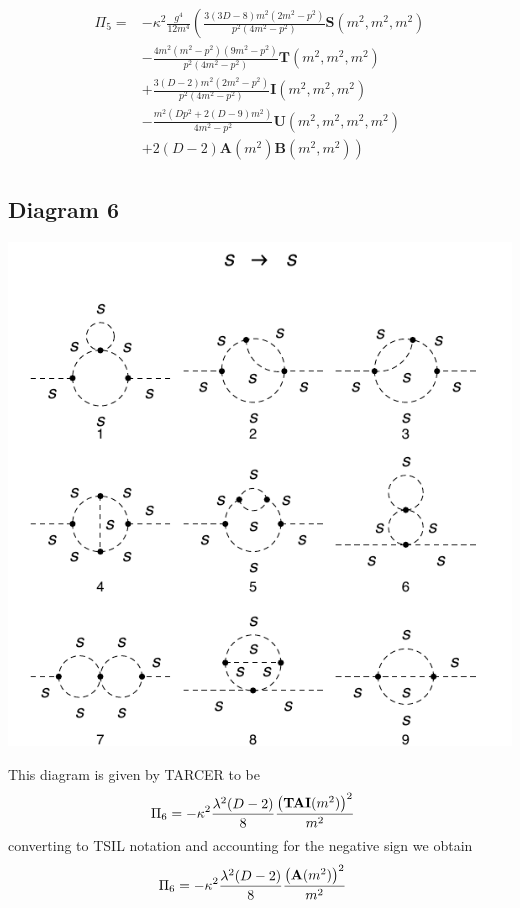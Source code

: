 \documentclass[11pt]{article}
\begin{document}
\begin{align}
\begin{split}
\Pi_5 =& - \kappa^2 \frac{g^4}{12 m^4} \left( \frac{3(3D-8)m^2(2m^2-p^2)}{p^2(4m^2-p^2)}\mathbf{S}(m^2,m^2,m^2)\right. \\
&-\frac{4m^2(m^2-p^2)(9m^2-p^2)}{p^2(4m^2-p^2)}\mathbf{T}(m^2,m^2,m^2)\\
&+\frac{3(D-2)m^2(2m^2-p^2)}{p^2(4m^2-p^2)}\mathbf{I}(m^2,m^2,m^2)\\
&-\frac{m^2(D p^2+2(D-9)m^2)}{4m^2-p^2}\mathbf{U}(m^2,m^2,m^2,m^2)\\
&\left.+2(D-2)\mathbf{A}(m^2) \mathbf{B}(m^2,m^2) \right)
\end{split}
\end{align}


\subsection*{Diagram 6}
\noindent\begin{minipage}{0.3\textwidth}
\begin{center}
\includegraphics{2loop_6.pdf}
\end{center}
\end{minipage}
\noindent\begin{minipage}{0.7\textwidth}
This diagram is given by TARCER to be
\begin{align}
\Pi_6 &= -\kappa^2 \frac{\lambda^2(D-2)}{8}\frac{ \left({\tt{\mathbf{TAI}}} (m^2)\right)^2}{ m^2 }  
\end{align}
converting to TSIL notation and accounting for the negative sign we obtain
\begin{align}
\Pi_6 &=- \kappa^2 \frac{\lambda^2(D-2)}{8}\frac{ \left({\tt{\mathbf{A}}} (m^2)\right)^2}{ m^2 }  
\end{align}
\end{minipage}
\end{document}
